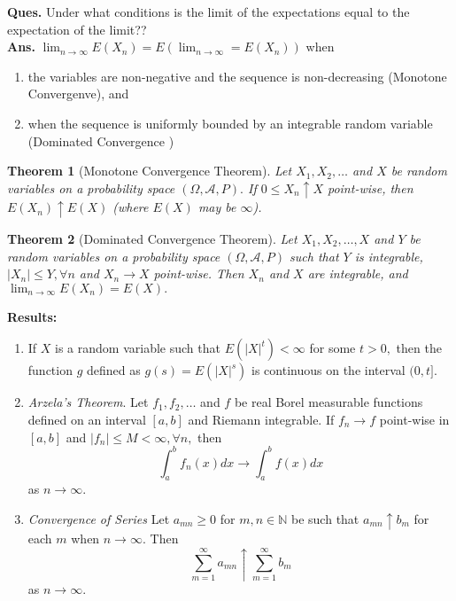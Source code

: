 \documentclass[12pt]{report} \addtolength{\textheight}{2in}
\newtheorem{thm}{Theorem}
\newcommand{\bigN}{\mathbb{N}}
\newcommand{\bigA}{\mathcal{A}}
\newcommand{\probsp}{(\Omega, \bigA, P)}
\begin{document}
\textbf{Ques.}  Under what conditions is the limit of the expectations equal to the expectation of the limit?? \\
\textbf{Ans.} $\lim_{n\to\infty}E(X_n)=E(\lim_{n\to\infty}=E(X_n))$ when
\begin{enumerate}
\item the variables are non-negative and the sequence is non-decreasing (Monotone Convergenve), and 
\item when the sequence is uniformly bounded by an integrable random variable (Dominated Convergence )
\end{enumerate}
\begin{thm} [Monotone Convergence Theorem]
Let $X_1,X_2,\dots $ and $X$ be random variables on a probability space $\probsp.$ If $0 \leq X_n \uparrow X$ point-wise, then $E(X_n) \uparrow E(X)$ (where $E(X)$ may be $\infty$).
\end{thm}
\begin{thm}[Dominated Convergence Theorem]
Let $X_1,X_2,\dots, X$ and $Y$ be random variables on a probability space $\probsp$ such that $Y$ is integrable, $|X_n| \leq Y,  \forall n$ and $X_n \to X$ point-wise. Then $X_n$ and $X$ are integrable, and
$\lim_{n\to\infty} E(X_n) =E(X).$  
\end{thm}
\textbf{Results:}
\begin{enumerate}[(1)]
\item If $X$ is a random variable such that $E(|X|^t) < \infty$ for some $t > 0,$ then the function $g$ defined as $g(s)=E(|X|^s)$ is continuous on the interval $(0,t].$
\item \textit{Arzela's Theorem}. Let $f_1,f_2,\dots$ and $f$ be real Borel measurable functions defined on an interval $[a,b]$ and Riemann integrable. If $f_n \to f$ point-wise in $[a,b]$ and $|f_n| \leq M < \infty, \forall n,$ then
\begin{displaymath}
\int_{a}^{b} f_n(x)dx \to \int_{a}^{b} f(x) dx
\end{displaymath}
as $n\to \infty.$
\item \textit{Convergence of Series} Let $a_{mn} \geq 0$ for $m,n \in \bigN$ be such that $a_{mn} \uparrow b_m$ for each $m$ when $n \to \infty.$ Then
\begin{displaymath}
\sum_{m=1}^{\infty} a_{mn} \uparrow \sum_{m=1}^{\infty} b_m
\end{displaymath}
as $n\to \infty.$
\end{enumerate}
\end{document}
